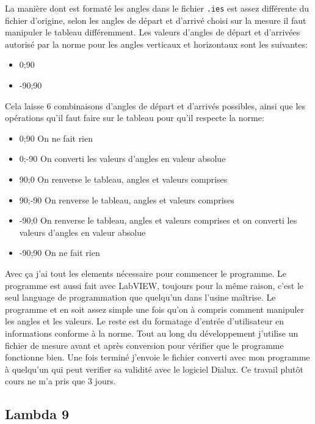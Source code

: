 \documentclass[12pt]{article}
\begin{document}
La manière dont est formaté les angles dans le fichier \verb|.ies| est assez différente du fichier d'origine, selon les angles de départ et d'arrivé choisi sur la mesure il faut manipuler le tableau différemment.
Les valeurs d'angles de départ et d'arrivées autorisé par la norme pour les angles verticaux et horizontaux sont les suivantes:

\begin{itemize}
	\item 0;90
	\item -90;90
\end{itemize}

Cela laisse 6 combinaisons d'angles de départ et d'arrivés possibles, ainsi que les opérations qu'il faut faire sur le tableau pour qu'il respecte la norme:

\begin{itemize}
	\item 0;90 On ne fait rien
	\item 0;-90 On converti les valeurs d'angles en valeur absolue
	\item 90;0 On renverse le tableau, angles et valeurs comprises
	\item 90;-90 On renverse le tableau, angles et valeurs comprises
	\item -90;0 On renverse le tableau, angles et valeurs comprises et on converti les valeurs d'angles en valeur absolue
	\item -90;90 On ne fait rien
\end{itemize}

Avec ça j'ai tout les elements nécessaire pour commencer le programme.
Le programme est aussi fait avec LabVIEW, toujours pour la même raison, c'est le seul language de programmation que quelqu'un dans l'usine maîtrise.
Le programme et en soit assez simple une fois qu'on à compris comment manipuler les angles et les valeurs.
Le reste est du formatage d'entrée d'utilisateur en informations conforme à la norme.
Tout au long du développement j'utilise un fichier de mesure avant et après conversion pour vérifier que le programme fonctionne bien.
Une fois terminé j'envoie le fichier converti avec mon programme à quelqu'un qui peut verifier sa validité avec le logiciel Dialux.
Ce travail plutôt cours ne m'a pris que 3 jours.

\newpage
\subsection{ Lambda 9 }
\end{document}

